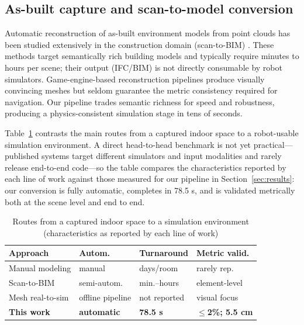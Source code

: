 \documentclass[conference]{IEEEtran}
\begin{document}
\subsection{As-built capture and scan-to-model conversion}
Automatic reconstruction of as-built environment models from point
clouds has been studied extensively in the construction domain
(scan-to-BIM) \cite{scan2bim}. These methods target semantically rich
building models and typically require minutes to hours per scene;
their output (IFC/BIM) is not directly consumable by robot simulators.
Game-engine-based reconstruction pipelines produce visually convincing
meshes but seldom guarantee the metric consistency required for
navigation. Our pipeline trades semantic richness for speed and
robustness, producing a physics-consistent simulation stage in tens of
seconds.

Table~\ref{tabcmp} contrasts the main routes from a captured indoor
space to a robot-usable simulation environment. A direct head-to-head
benchmark is not yet practical---published systems target different
simulators and input modalities and rarely release end-to-end
code---so the table compares the characteristics reported by each
line of work against those measured for our pipeline in
Section~\ref{sec:results}: our conversion is fully automatic,
completes in 78.5 s, and is validated metrically both at the scene
level and end to end.

\begin{table}[htbp]
\caption{Routes from a captured indoor space to a simulation
environment (characteristics as reported by each line of work)}
\begin{center}
\footnotesize
\setlength{\tabcolsep}{3.5pt}
\begin{tabular}{|l|l|l|l|}
\hline
\textbf{Approach} & \textbf{Autom.} & \textbf{Turnaround} &
\textbf{Metric valid.} \\
\hline
Manual modeling \cite{tao2019} & manual & days/room & rarely rep. \\
Scan-to-BIM \cite{scan2bim} & semi-autom. & min.--hours & element-level \\
Mesh real-to-sim \cite{gibson} & offline pipeline & not reported & visual focus \\
\textbf{This work} & \textbf{automatic} & \textbf{78.5 s} &
\textbf{$\leq$2\%; 5.5 cm} \\
\hline
\end{tabular}
\label{tabcmp}
\end{center}
\end{table}
\end{document}
